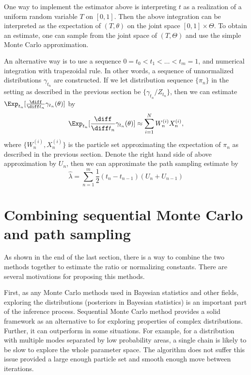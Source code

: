 One way to implement the estimator above is interpreting $t$ as a realization
of a uniform random variable $T$ on $[0,1]$. Then the above integration can be
interpreted as the expectation of $(T,\theta)$ on the joint space
$[0,1]\times\Theta$. To obtain an estimate, one can sample from the joint
space of $(T, \Theta)$ and use the simple Monte Carlo approximation.

An alternative way is to use a sequence $0 = t_0 < t_1 < \dots < t_m = 1$, and
numerical integration with trapezoidal rule. In other words, a sequence of
unnormalized distributions $\gamma_{t_n}$ are constructed. If we let
distribution sequence $\{\pi_n\}$ in the \smc setting as described in the
previous section be $\{\gamma_{t_n}/Z_{t_n}\}$, then we can estimate
$\Exp_{t_n}[\frac{\diff}{\diff t_n}\gamma_{t_n}(\theta)]$ by
\begin{equation}
  \Exp_{t_n}[\frac{\diff}{\diff t_n}\gamma_{t_n}(\theta)]
  \approx \sum_{i=1}^NW_n^{(i)}X_n^{(i)},
\end{equation}
where $\{W_n^{(i)},X_n^{(i)}\}$ is the particle set approximating the
expectation of $\pi_n$ as described in the previous section. Denote the right
hand side of above approximation by $U_n$, then we can approximate the path
sampling estimate by
\begin{equation}
  \hat{\lambda} = \sum_{n = 1}^m \frac{1}{2}(t_{n} - t_{n-1})(U_n + U_{n-1})
\end{equation}

\section{Combining sequential Monte Carlo and path sampling}
\label{sec:Combining sequential Monte Carlo and path sampling}

As shown in the end of the last section, there is a way to combine the two
methods together to estimate the ratio or normalizing constants. There are
several motivations for proposing this methods.

First, as any Monte Carlo methods used in Bayesian statistics and other
fields, exploring the distributions (posteriors in Bayesian statistics) is an
important part of the inference process. Sequential Monte Carlo method
provides a solid framework as an alternative to \mcmc for exploring properties
of complex distributions. Further, it can outperform \mcmc in some situations.
For example, for a distribution with multiple modes separated by low
probability areas, a single chain \mha is likely to be slow to explore the
whole parameter space. The \smc algorithm does not suffer this issue provided
a large enough particle set and smooth enough move between iterations.

